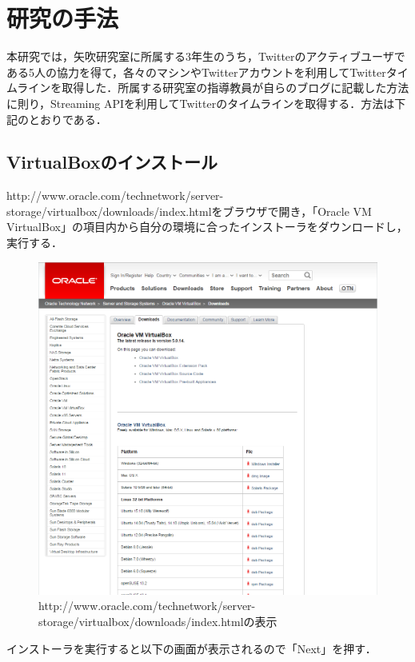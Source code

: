\section{研究の手法}
本研究では，矢吹研究室に所属する3年生のうち，Twitterのアクティブユーザである5人の協力を得て，各々のマシンやTwitterアカウントを利用してTwitterタイムラインを取得した．所属する研究室の指導教員が自らのブログに記載した方法に則り，Streaming APIを利用してTwitterのタイムラインを取得する．方法は下記のとおりである．

\subsection{VirtualBoxのインストール}
http://www.oracle.com/technetwork/server-storage/virtualbox/downloads/index.htmlをブラウザで開き，「Oracle VM VirtualBox」の項目内から自分の環境に合ったインストーラをダウンロードし，実行する．

\begin{figure}[H]
\centering
\includegraphics[width=13cm]{virtualboxdownload.PNG}
\caption{http://www.oracle.com/technetwork/server-storage/virtualbox/downloads/index.htmlの表示}\label{vboxdownload}
\end{figure}

インストーラを実行すると以下の画面が表示されるので「Next」を押す．

